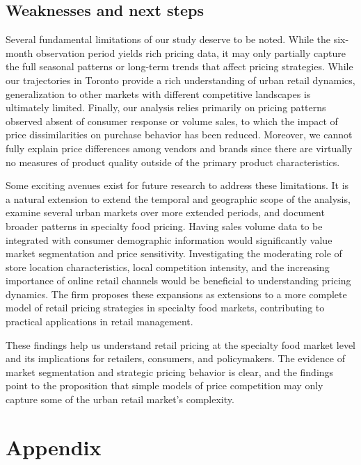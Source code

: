 \documentclass[
  letterpaper,
  DIV=11,
  numbers=noendperiod]{scrartcl}
\begin{document}
\subsection{Weaknesses and next steps}\label{weaknesses-and-next-steps}

Several fundamental limitations of our study deserve to be noted. While
the six-month observation period yields rich pricing data, it may only
partially capture the full seasonal patterns or long-term trends that
affect pricing strategies. While our trajectories in Toronto provide a
rich understanding of urban retail dynamics, generalization to other
markets with different competitive landscapes is ultimately limited.
Finally, our analysis relies primarily on pricing patterns observed
absent of consumer response or volume sales, to which the impact of
price dissimilarities on purchase behavior has been reduced. Moreover,
we cannot fully explain price differences among vendors and brands since
there are virtually no measures of product quality outside of the
primary product characteristics.

Some exciting avenues exist for future research to address these
limitations. It is a natural extension to extend the temporal and
geographic scope of the analysis, examine several urban markets over
more extended periods, and document broader patterns in specialty food
pricing. Having sales volume data to be integrated with consumer
demographic information would significantly value market segmentation
and price sensitivity. Investigating the moderating role of store
location characteristics, local competition intensity, and the
increasing importance of online retail channels would be beneficial to
understanding pricing dynamics. The firm proposes these expansions as
extensions to a more complete model of retail pricing strategies in
specialty food markets, contributing to practical applications in retail
management.

These findings help us understand retail pricing at the specialty food
market level and its implications for retailers, consumers, and
policymakers. The evidence of market segmentation and strategic pricing
behavior is clear, and the findings point to the proposition that simple
models of price competition may only capture some of the urban retail
market's complexity.

\newpage

\appendix

\section*{Appendix}\label{appendix}
\end{document}
